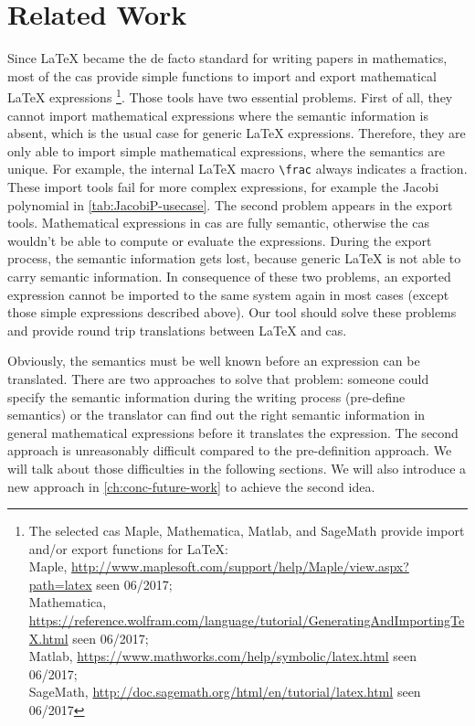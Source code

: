 \section{Related Work}\label{sec:related-work}
Since \LaTeX{} became the de facto standard for writing papers in mathematics, most of the \gls{cas} provide simple functions to import and export mathematical \LaTeX{} expressions%
\footnote{The selected \gls{cas} Maple, Mathematica, Matlab, and SageMath provide import and/or export functions for \LaTeX:\\
Maple, \url{http://www.maplesoft.com/support/help/Maple/view.aspx?path=latex} seen 06/2017;\\
Mathematica, \url{https://reference.wolfram.com/language/tutorial/GeneratingAndImportingTeX.html} seen 06/2017;\\
Matlab, \url{https://www.mathworks.com/help/symbolic/latex.html} seen 06/2017;\\
SageMath, \url{http://doc.sagemath.org/html/en/tutorial/latex.html} seen 06/2017}. %
Those tools have two essential problems. First of all, they cannot import mathematical expressions where the semantic information is absent, which is the usual case for generic \LaTeX{} expressions. Therefore, they are only able to import simple mathematical expressions, where the semantics are unique. For example, the internal \LaTeX{} macro \verb|\frac| always indicates a fraction. These import tools fail for more complex expressions, for example the Jacobi polynomial in \cref{tab:JacobiP-usecase}. The second problem appears in the export tools. Mathematical expressions in \gls{cas} are fully semantic, otherwise the \gls{cas} wouldn't be able to compute or evaluate the expressions. During the export process, the semantic information gets lost, because generic \LaTeX{} is not able to carry semantic information. In consequence of these two problems, an exported expression cannot be imported to the same system again in most cases (except those simple expressions described above). Our tool should solve these problems and provide round trip translations between \LaTeX{} and \gls{cas}.

Obviously, the semantics must be well known before an expression can be translated. There are two approaches to solve that problem: someone could specify the semantic information during the writing process (pre-define semantics) or the translator can find out the right semantic information in general mathematical expressions before it translates the expression. The second approach is unreasonably difficult compared to the pre-definition approach. We will talk about those difficulties in the following sections. We will also introduce a new approach in \cref{ch:conc-future-work} to achieve the second idea.

